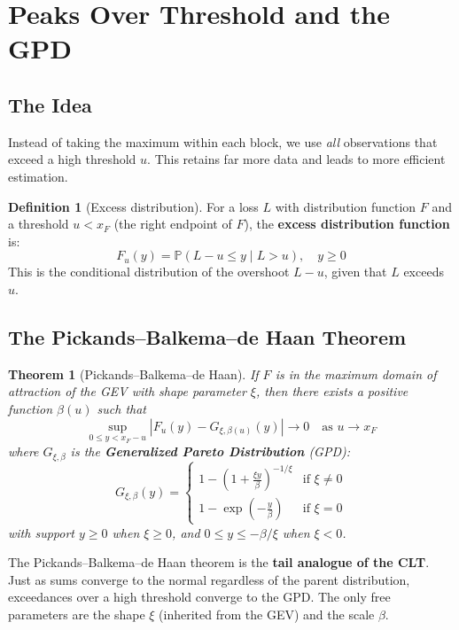 \documentclass[11pt, a4paper]{article}
\theoremstyle{definition}
\newtheorem{definition}{Definition}[section]
\theoremstyle{plain}
\newtheorem{theorem}{Theorem}[section]
\theoremstyle{remark}
\newcommand{\PV}{\mathbb{P}}
\begin{document}
\section{Peaks Over Threshold and the GPD}
\label{sec:gpd}

\subsection{The Idea}

Instead of taking the maximum within each block,
we use \emph{all} observations that exceed a high threshold $u$.
This retains far more data and leads to more efficient estimation.

\begin{definition}[Excess distribution]
For a loss $L$ with distribution function $F$ and a threshold $u < x_F$ (the right endpoint of $F$),
the \textbf{excess distribution function} is:
\[
    F_u(y) = \PV(L - u \leq y \mid L > u), \quad y \geq 0
\]
This is the conditional distribution of the overshoot $L - u$, given that $L$ exceeds $u$.
\end{definition}

\subsection{The Pickands--Balkema--de Haan Theorem}

\begin{theorem}[Pickands--Balkema--de Haan]\label{thm:pbdh}
If $F$ is in the maximum domain of attraction of the GEV with shape parameter $\xi$,
then there exists a positive function $\beta(u)$ such that
\[
    \sup_{0 \leq y < x_F - u} \left| F_u(y) - G_{\xi, \beta(u)}(y) \right| \to 0 \quad \text{as } u \to x_F
\]
where $G_{\xi, \beta}$ is the \textbf{Generalized Pareto Distribution} (GPD):
\[
    G_{\xi, \beta}(y) =
    \begin{cases}
        1 - \left(1 + \frac{\xi y}{\beta}\right)^{-1/\xi} & \text{if } \xi \neq 0 \\[6pt]
        1 - \exp\!\left(-\frac{y}{\beta}\right) & \text{if } \xi = 0
    \end{cases}
\]
with support $y \geq 0$ when $\xi \geq 0$, and $0 \leq y \leq -\beta/\xi$ when $\xi < 0$.
\end{theorem}

\begin{keyidea}
The Pickands--Balkema--de Haan theorem is the \textbf{tail analogue of the CLT}.
Just as sums converge to the normal regardless of the parent distribution,
exceedances over a high threshold converge to the GPD.
The only free parameters are the shape $\xi$ (inherited from the GEV) and the scale $\beta$.
\end{keyidea}
\end{document}
